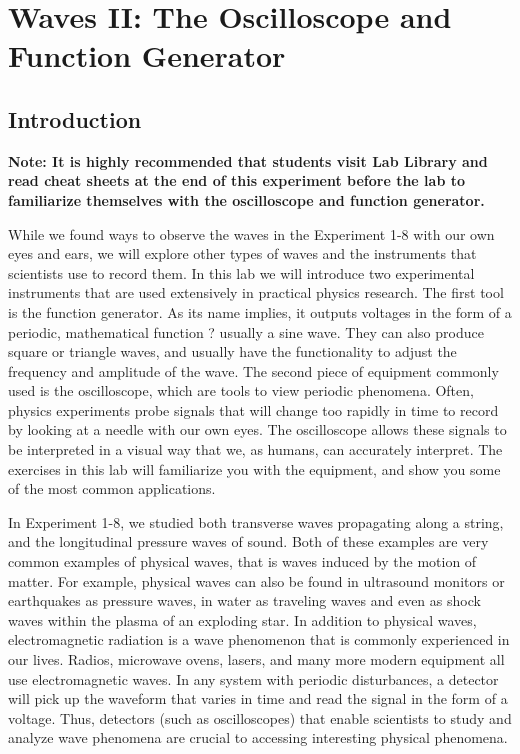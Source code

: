 \chapter{Waves II: The Oscilloscope and Function Generator}
\label{chap:waves}
\section{Introduction}
\textbf{Note: It is highly recommended that students visit Lab Library and read cheat sheets at the end of this experiment before the lab to familiarize themselves with the oscilloscope and function generator.}

While we found ways to observe the waves in the Experiment 1-8 with our own eyes and ears, we will explore other types of waves and the instruments that scientists use to record them. In this lab we will introduce two experimental instruments that are used extensively in practical physics research. The first tool is the function generator. As its name implies, it outputs voltages in the form of a periodic, mathematical function ? usually a sine wave. They can also produce square or triangle waves, and usually have the functionality to adjust the frequency and amplitude of the wave. The second piece of equipment commonly used is the oscilloscope, which are tools to view periodic phenomena. Often, physics experiments probe signals that will change too rapidly in time to record by looking at a needle with our own eyes. The oscilloscope allows these signals to be interpreted in a visual way that we, as humans, can accurately interpret. The exercises in this lab will familiarize you with the equipment, and show you some of the most common applications.\myskip

In Experiment 1-8, we studied both transverse waves propagating along a string, and the longitudinal pressure waves of sound. Both of these examples are very common examples of physical waves, that is waves induced by the motion of matter. For example, physical waves can also be found in ultrasound monitors or earthquakes as pressure waves, in water as traveling waves and even as shock waves within the plasma of an exploding star. In addition to physical waves, electromagnetic radiation is a wave phenomenon that is commonly experienced in our lives. Radios, microwave ovens, lasers, and many more modern equipment all use electromagnetic waves. In any system with periodic disturbances, a detector will pick up the waveform that varies in time and read the signal in the form of a voltage. Thus, detectors (such as oscilloscopes) that enable scientists to study and analyze wave phenomena are crucial to accessing interesting physical phenomena.


